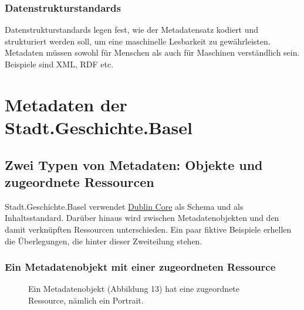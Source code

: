 \documentclass[
  letterpaper,
  DIV=11,
  numbers=noendperiod]{scrartcl}
\begin{document}
\subsubsection{Datenstrukturstandards}\label{datenstrukturstandards}

Datenstrukturstandards legen fest, wie der Metadatensatz kodiert und
strukturiert werden soll, um eine maschinelle Lesbarkeit zu
gewährleisten. Metadaten müssen sowohl für Menschen als auch für
Maschinen verständlich sein. Beispiele sind XML, RDF etc.

\section{Metadaten der Stadt.Geschichte.Basel}\label{sec-metadaten}

\subsection{Zwei Typen von Metadaten: Objekte und zugeordnete
Ressourcen}\label{zwei-typen-von-metadaten-objekte-und-zugeordnete-ressourcen}

Stadt.Geschichte.Basel verwendet
\href{https://www.dublincore.org}{Dublin Core} als Schema und als
Inhaltsstandard. Darüber hinaus wird zwischen Metadatenobjekten und den
damit verknüpften Ressourcen unterschieden. Ein paar fiktive Beispiele
erhellen die Überlegungen, die hinter dieser Zweiteilung stehen.

\subsubsection{Ein Metadatenobjekt mit einer zugeordneten
Ressource}\label{ein-metadatenobjekt-mit-einer-zugeordneten-ressource}

\begin{figure}


\caption{\label{fig-metadata-1}Ein Metadatenobjekt (Abbildung 13) hat
eine zugeordnete Ressource, nämlich ein Portrait.}

\end{figure}%
\end{document}
